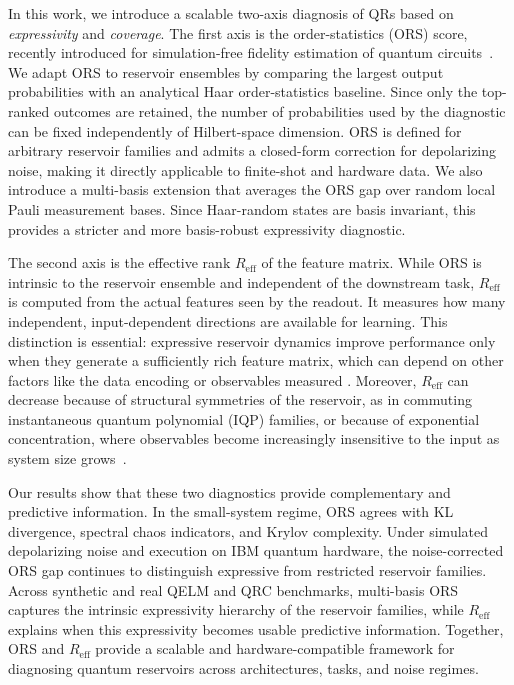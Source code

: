 \documentclass[
    aps,
    pre,
    amsmath,
    amssymb,
    reprint,
    superscriptaddress,
    preprintnumbers,
]{revtex4-2}
\begin{document}
In this work, we introduce a scalable two-axis diagnosis of QRs based on \emph{expressivity} and \emph{coverage}. The first axis is the order-statistics (ORS) score, recently introduced for simulation-free fidelity estimation of quantum circuits~\cite{micklitz2025ors}. We adapt ORS to reservoir ensembles by comparing the largest output probabilities with an analytical Haar order-statistics baseline. Since only the top-ranked outcomes are retained, the number of probabilities used by the diagnostic can be fixed independently of Hilbert-space dimension. ORS is defined for arbitrary reservoir families and admits a closed-form correction for depolarizing noise, making it directly applicable to finite-shot and hardware data. We also introduce a multi-basis extension that averages the ORS gap over random local Pauli measurement bases. Since Haar-random states are basis invariant, this provides a stricter and more basis-robust expressivity diagnostic.

The second axis is the effective rank $R_{\mathrm{eff}}$ of the feature matrix. While ORS is intrinsic to the reservoir ensemble and independent of the downstream task, $R_{\mathrm{eff}}$ is computed from the actual features seen by the readout. It measures how many independent, input-dependent directions are available for learning. This distinction is essential: expressive reservoir dynamics improve performance only when they generate a sufficiently rich feature matrix, which can depend on other factors like the data encoding or observables measured \cite{xiong2024fundamental}. Moreover, $R_{\mathrm{eff}}$ can decrease because of structural symmetries of the reservoir, as in commuting instantaneous quantum polynomial (IQP) families, or because of exponential concentration, where observables become increasingly insensitive to the input as system size grows~\cite{xiong2024fundamental, sannia2025concentration,
thanasilp2024kernels}.

Our results show that these two diagnostics provide complementary and predictive information. In the small-system regime, ORS agrees with KL divergence, spectral chaos indicators, and Krylov complexity. Under simulated depolarizing noise and execution on IBM quantum hardware, the noise-corrected ORS gap continues to distinguish expressive from restricted reservoir families. Across synthetic and real QELM and QRC benchmarks, multi-basis ORS captures the intrinsic expressivity hierarchy of the reservoir families, while $R_{\mathrm{eff}}$ explains when this expressivity becomes usable predictive information. Together, ORS and $R_{\mathrm{eff}}$ provide a scalable and hardware-compatible framework for diagnosing quantum reservoirs across architectures, tasks, and noise regimes.
\end{document}
